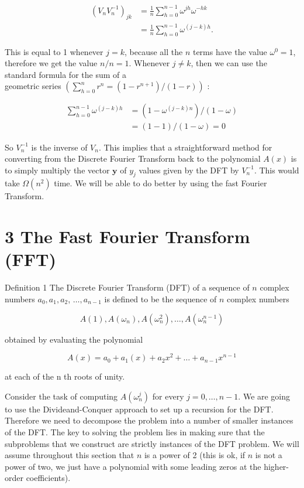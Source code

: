 $$
\begin{aligned}
\left(V_{n} V_{n}^{-1}\right)_{j k} & =\frac{1}{n} \sum_{h=0}^{n-1} \omega^{j h} \omega^{-h k} \\
& =\frac{1}{n} \sum_{h=0}^{n-1} \omega^{(j-k) h} .
\end{aligned}
$$

This is equal to 1 whenever $j=k$, because all the $n$ terms have the value $\omega^{0}=1$, therefore we get the value $n / n=1$. Whenever $j \neq k$, then we can use the standard formula for the sum of a\\
geometric series $\left(\sum_{h=0}^{n} r^{n}=\left(1-r^{n+1}\right) /(1-r)\right)$ :

$$
\begin{aligned}
\sum_{h=0}^{n-1} \omega^{(j-k) h} & =\left(1-\omega^{(j-k) n}\right) /(1-\omega) \\
& =(1-1) /(1-\omega)=0
\end{aligned}
$$

So $V_{n}^{-1}$ is the inverse of $V_{n}$. This implies that a straightforward method for converting from the Discrete Fourier Transform back to the polynomial $A(x)$ is to simply multiply the vector $\mathbf{y}$ of $y_{j}$ values given by the DFT by $V_{n}^{-1}$. This would take $\Omega\left(n^{2}\right)$ time. We will be able to do better by using the fast Fourier Transform.

\section*{3 The Fast Fourier Transform (FFT)}
Definition 1 The Discrete Fourier Transform (DFT) of a sequence of $n$ complex numbers $a_{0}, a_{1}, a_{2}$, $\ldots, a_{n-1}$ is defined to be the sequence of $n$ complex numbers

$$
A(1), A\left(\omega_{n}\right), A\left(\omega_{n}^{2}\right), \ldots, A\left(\omega_{n}^{n-1}\right)
$$

obtained by evaluating the polynomial

$$
A(x)=a_{0}+a_{1}(x)+a_{2} x^{2}+\ldots+a_{n-1} x^{n-1}
$$

at each of the $\mathrm{n}$ th roots of unity.

Consider the task of computing $A\left(\omega_{n}^{j}\right)$ for every $j=0, \ldots, n-1$. We are going to use the Divideand-Conquer approach to set up a recursion for the DFT. Therefore we need to decompose the problem into a number of smaller instances of the DFT. The key to solving the problem lies in making sure that the subproblems that we construct are strictly instances of the DFT problem. We will assume throughout this section that $n$ is a power of 2 (this is ok, if $n$ is not a power of two, we just have a polynomial with some leading zeros at the higher-order coefficients).

